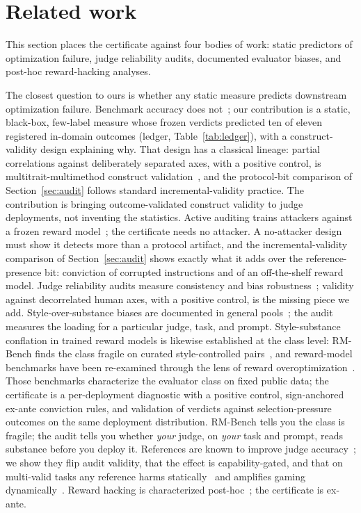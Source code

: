 \section{Related work}
\label{sec:related}

This section places the certificate against four bodies of work: static predictors of optimization failure, judge reliability audits, documented evaluator biases, and post-hoc reward-hacking analyses.

The closest question to ours is whether any static measure predicts downstream optimization failure.
Benchmark accuracy does not~\cite{wen2024rethinking}; our contribution is a static, black-box, few-label measure whose frozen verdicts predicted ten of eleven registered in-domain outcomes (ledger, Table~\ref{tab:ledger}), with a construct-validity design explaining why.
That design has a classical lineage: partial correlations against deliberately separated axes, with a positive control, is multitrait-multimethod construct validation~\cite{campbellfiske1959}, and the protocol-bit comparison of Section~\ref{sec:audit} follows standard incremental-validity practice.
The contribution is bringing outcome-validated construct validity to judge deployments, not inventing the statistics.
Active auditing trains attackers against a frozen reward model~\cite{beigi2026ara}; the certificate needs no attacker.
A no-attacker design must show it detects more than a protocol artifact, and the incremental-validity comparison of Section~\ref{sec:audit} shows exactly what it adds over the reference-presence bit: conviction of corrupted instructions and of an off-the-shelf reward model.
Judge reliability audits measure consistency and bias robustness~\cite{judgechanges2026,zheng2023judging}; validity against decorrelated human axes, with a positive control, is the missing piece we add.
Style-over-substance biases are documented in general pools~\cite{wu2023style,dubois2024length,singhal2023long}; the audit measures the loading for a particular judge, task, and prompt.
Style-substance conflation in trained reward models is likewise established at the class level: RM-Bench finds the class fragile on curated style-controlled pairs~\cite{rmbench2024}, and reward-model benchmarks have been re-examined through the lens of reward overoptimization~\cite{kim2025lens}.
Those benchmarks characterize the evaluator class on fixed public data; the certificate is a per-deployment diagnostic with a positive control, sign-anchored ex-ante conviction rules, and validation of verdicts against selection-pressure outcomes on the same deployment distribution.
RM-Bench tells you the class is fragile; the audit tells you whether \emph{your} judge, on \emph{your} task and prompt, reads substance before you deploy it.
References are known to improve judge accuracy~\cite{refguided2024,smalljudges2025}; we show they flip audit validity, that the effect is capability-gated, and that on multi-valid tasks any reference harms statically~\cite{generous2026,dobefore2025} and amplifies gaming dynamically~\cite{companionD}.
Reward hacking is characterized post-hoc~\cite{gao2022scaling,skalse2022defining,coste2023ensembles,eisenstein2023helping,selfplay2026}; the certificate is ex-ante.
